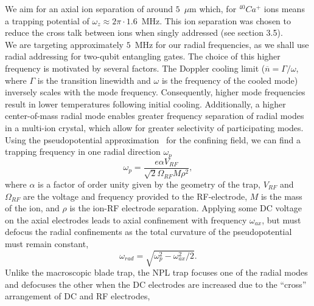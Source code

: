 \documentclass[12pt]{iopart}
\begin{document}

We aim for an axial ion separation of around $5$~$\mu$m which, for
$^{40}Ca^{+}$ ions means a trapping potential of $\omega_z \approx
2\pi \cdot 1.6$~MHz. This ion separation was chosen to reduce the
cross talk between ions when singly addressed (see section 3.5).\\ We
are targeting approximately $5$~MHz for our radial frequencies, as we
shall use radial addressing for two-qubit entangling gates. The choice
of this higher frequency is motivated by several factors. The Doppler
cooling limit ($\overline{n} = \Gamma/\omega$, where $\Gamma$ is the
transition linewidth and $\omega$ is the frequency of the cooled mode)
inversely scales with the mode frequency. Consequently, higher mode
frequencies result in lower temperatures following initial
cooling. Additionally, a higher center-of-mass radial mode enables
greater frequency separation of radial modes in a multi-ion crystal,
which allow for greater selectivity of participating modes. \\ Using
the pseudopotential approximation~\cite{madsen_planar_2004} for the confining field, we can find
a trapping frequency in one radial direction $\omega_p$
\begin{equation}
\omega_p = \frac{e\alpha V_{RF}}{\sqrt{2}\Omega_{RF}M\rho^2},
\end{equation}
where $\alpha$ is a factor of order unity given by the geometry of the
trap, $V_{RF}$ and $\Omega_{RF}$ are the voltage and frequency
provided to the RF-electrode, $M$ is the mass of the ion, and $\rho$
is the ion-RF electrode separation.  Applying some DC voltage on the
axial electrodes leads to axial confinement with frequency
$\omega_{ax}$, but must defocus the radial confinements as the total
curvature of the pseudopotential must remain constant,
\begin{equation}
\omega_{rad} = \sqrt{\omega_p^2 - \omega_{ax}^2/2}.
\end{equation}
Unlike the macroscopic blade trap, the NPL trap focuses one of
the radial modes and defocuses the other when the DC electrodes are
increased due to the ``cross'' arrangement of DC and RF electrodes,
\end{document}
